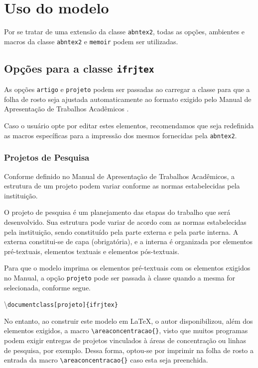 %
%
\chapter{Uso do modelo}

Por se tratar de uma extensão da classe \verb|abntex2|, todas as opções, ambientes e macros da classe \verb|abntex2|\cite{abntex2classe}
e \verb|memoir|\cite{madsen2021memoir} podem ser utilizadas.


\section{Opções para a classe \texttt{ifrjtex}}

As opções \verb|artigo| e \verb|projeto| podem ser passadas ao carregar a classe para que a folha de rosto seja ajustada automaticamente ao formato exigido pelo Manual de Apresentação de Trabalhos Acadêmicos \cite{ifrjtccs}.

Caso o usuário opte por editar estes elementos, recomendamos que seja redefinida as macros específicas para a impressão dos mesmos fornecidas pela \verb|abntex2|\cite{abntex2classe}.

\subsection{Projetos de Pesquisa}
Conforme definido no Manual de Apresentação de Trabalhos Acadêmicos, a estrutura de um projeto podem variar conforme as normas estabelecidas pela instituição.
\begin{citacao}
O projeto de pesquisa é um planejamento das etapas do trabalho que será desenvolvido. Sua estrutura pode variar de acordo com as normas estabelecidas pela instituição, sendo constituído pela parte externa e pela parte interna. A externa constitui-se de capa (obrigatória), e a interna é organizada por elementos pré-textuais, elementos textuais e elementos pós-textuais.\cite{ifrjtccs}
\end{citacao}

Para que o modelo imprima os elementos pré-textuais com os elementos exigidos no Manual, a opção \verb|projeto| pode ser passada à classe quando a mesma for selecionada, conforme segue.

\textbackslash\texttt{documentclass[projeto]\{ifrjtex\}}

No entanto, ao construir este modelo em \LaTeX, o autor disponibilizou, além dos elementos exigidos, a macro \verb|\areaconcentracao{}|, visto que muitos programas podem exigir entregas de projetos vinculados à áreas de concentração ou linhas de pesquisa, por exemplo. Dessa forma, optou-se por imprimir na folha de rosto a entrada da macro \verb|\areaconcentracao{}| caso esta seja preenchida.

